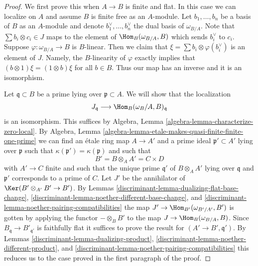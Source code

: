 \begin{proof}

We first prove this when $A \to B$ is finite and flat. In this case we can
localize on $A$ and assume $B$ is finite free as an $A$-module. Let
$b_1, \ldots, b_n$ be a basis of $B$ as an $A$-module and denote
$b_1^\vee, \ldots, b_n^\vee$ the dual basis of $\omega_{B/A}$. Note that
$\sum b_i \otimes c_i \in J$ maps to the element of $\Hom_B(\omega_{B/A}, B)$
which sends $b_i^\vee$ to $c_i$. Suppose $\varphi : \omega_{B/A} \to B$
is $B$-linear. Then we claim that $\xi = \sum b_i \otimes \varphi(b_i^\vee)$
is an element of $J$. Namely, the $B$-linearity of $\varphi$
exactly implies that $(b \otimes 1)\xi = (1 \otimes b)\xi$ for all $b \in B$.
Thus our map has an inverse and it is an isomorphism.

\medskip\noindent
Let $\mathfrak q \subset B$ be a prime lying over $\mathfrak p \subset A$.
We will show that the localization
$$
J_\mathfrak q
\longrightarrow
\Hom_B(\omega_B/A, B)_\mathfrak q
$$
is an isomorphism.
This suffices by Algebra, Lemma \ref{algebra-lemma-characterize-zero-local}.
By
Algebra, Lemma \ref{algebra-lemma-etale-makes-quasi-finite-finite-one-prime}
we can find an \'etale ring map $A \to A'$ and a prime
ideal $\mathfrak p' \subset A'$ lying over $\mathfrak p$
such that $\kappa(\mathfrak p') = \kappa(\mathfrak p)$ and
such that
$$
B' = B \otimes_A A' = C \times D
$$
with $A' \to C$ finite and such that the unique prime $\mathfrak q'$
of $B \otimes_A A'$ lying over $\mathfrak q$ and $\mathfrak p'$
corresponds to a prime of $C$. Let $J'$ be the annihilator of
$\Ker(B' \otimes_{A'} B' \to B')$. By
Lemmas \ref{discriminant-lemma-dualizing-flat-base-change},
\ref{discriminant-lemma-noether-different-base-change}, and
\ref{discriminant-lemma-noether-pairing-compatibilities}
the map $J' \to \Hom_{B'}(\omega_{B'/A'}, B')$
is gotten by applying the functor $- \otimes_B B'$
to the map $J \to \Hom_B(\omega_{B/A}, B)$.
Since $B_\mathfrak q \to B'_{\mathfrak q'}$ is faithfully flat
it suffices to prove the result for $(A' \to B', \mathfrak q')$.
By Lemmas \ref{discriminant-lemma-dualizing-product},
\ref{discriminant-lemma-noether-different-product}, and
\ref{discriminant-lemma-noether-pairing-compatibilities}
this reduces us to the case proved in the first
paragraph of the proof.
\end{proof}

